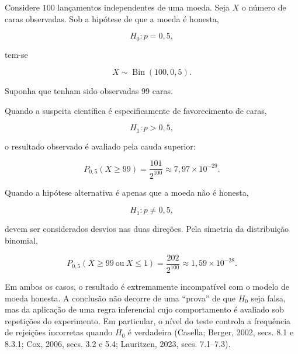 \documentclass[
  letterpaper,
  DIV=11,
  numbers=noendperiod]{scrreprt}
\begin{document}
Considere \(100\) lançamentos independentes de uma moeda. Seja \(X\) o
número de caras observadas. Sob a hipótese de que a moeda é honesta,

\[H_0:p=0{,}5,\]

tem-se

\[X\sim\operatorname{Bin}(100,0{,}5).\]

Suponha que tenham sido observadas \(99\) caras.

\begin{tcolorbox}[enhanced jigsaw, colback=white, leftrule=.75mm, colbacktitle=quarto-callout-note-color!10!white, breakable, titlerule=0mm, bottomtitle=1mm, title=\textcolor{quarto-callout-note-color}{\faInfo}\hspace{0.5em}{Interpretação unilateral}, colframe=quarto-callout-note-color-frame, toprule=.15mm, opacityback=0, bottomrule=.15mm, opacitybacktitle=0.6, arc=.35mm, toptitle=1mm, rightrule=.15mm, coltitle=black, left=2mm]

Quando a suspeita científica é especificamente de favorecimento de
caras,

\[H_1:p>0{,}5,\]

o resultado observado é avaliado pela cauda superior:

\[P_{0{,}5}(X\geq 99)
=\frac{101}{2^{100}}
\approx 7{,}97\times 10^{-29}.\]

\end{tcolorbox}

\begin{tcolorbox}[enhanced jigsaw, colback=white, leftrule=.75mm, colbacktitle=quarto-callout-note-color!10!white, breakable, titlerule=0mm, bottomtitle=1mm, title=\textcolor{quarto-callout-note-color}{\faInfo}\hspace{0.5em}{Interpretação bilateral}, colframe=quarto-callout-note-color-frame, toprule=.15mm, opacityback=0, bottomrule=.15mm, opacitybacktitle=0.6, arc=.35mm, toptitle=1mm, rightrule=.15mm, coltitle=black, left=2mm]

Quando a hipótese alternativa é apenas que a moeda não é honesta,

\[H_1:p\neq 0{,}5,\]

devem ser considerados desvios nas duas direções. Pela simetria da
distribuição binomial,

\[P_{0{,}5}(X\geq 99\ \text{ou}\ X\leq 1)
=\frac{202}{2^{100}}
\approx 1{,}59\times 10^{-28}.\]

\end{tcolorbox}

Em ambos os casos, o resultado é extremamente incompatível com o modelo
de moeda honesta. A conclusão não decorre de uma ``prova'' de que
\(H_0\) seja falsa, mas da aplicação de uma regra inferencial cujo
comportamento é avaliado sob repetições do experimento. Em particular, o
nível do teste controla a frequência de rejeições incorretas quando
\(H_0\) é verdadeira (Casella; Berger, 2002, secs. 8.1 e 8.3.1; Cox,
2006, secs. 3.2 e 5.4; Lauritzen, 2023, secs. 7.1--7.3).
\end{document}
